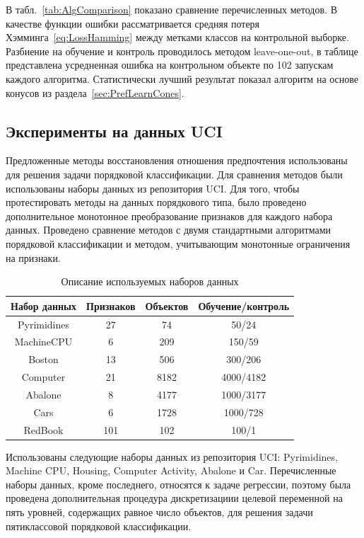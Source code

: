 \documentclass{elsarticle}
\begin{document}
В табл.~\ref{tab:AlgComparison} показано сравнение перечисленных методов. В качестве функции ошибки рассматривается средняя потеря Хэмминга~\eqref{eq:LossHamming} между метками классов на контрольной выборке. Разбиение на обучение и контроль проводилось методом leave-one-out, в таблице представлена усредненная ошибка на контрольном объекте по 102 запускам каждого алгоритма. Статистически лучший результат показал алгоритм на основе конусов из раздела~\ref{sec:PrefLearnCones}.

\subsection{Эксперименты на данных UCI}\label{sec:UCI}

Предложенные методы восстановления отношения предпочтения использованы для решения задачи порядковой классификации. Для сравнения методов были использованы наборы данных из репозитория UCI. Для того, чтобы протестировать методы на данных порядкового типа, было проведено дополнительное монотонное преобразование признаков для каждого набора данных. Проведено сравнение методов с двумя стандартными алгоритмами порядковой классификации и методом, учитывающим монотонные ограничения на признаки.

\begin{table}
\begin{center}
\caption{Описание используемых наборов данных}
\label{tab:BenchmarkData}
\begin{tabular}{cccc}
\hline
Набор данных & Признаков & Объектов & Обучение/контроль \\
\hline
Pyrimidines & 27 & 74 & 50/24 \\
MachineCPU & 6 & 209 & 150/59 \\
Boston & 13 & 506 & 300/206 \\
Computer & 21 & 8182 & 4000/4182 \\
Abalone & 8 & 4177 & 1000/3177 \\
Cars & 6 & 1728 & 1000/728 \\
RedBook & 101 & 102 & 100/1 \\
\hline
\end{tabular}
\end{center}
\end{table}

Использованы следующие наборы данных из репозитория UCI: Pyrimidines, Machine CPU, Housing, Computer Activity, Abalone и Car. Перечисленные наборы данных, кроме последнего, относятся к задаче регрессии, поэтому была проведена дополнительная процедура дискретизациии целевой переменной на пять уровней, содержащих равное число объектов, для решения задачи пятиклассовой порядковой классификации.
\end{document}

